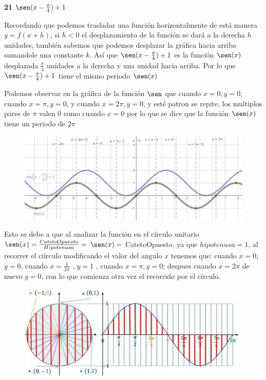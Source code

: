 \documentclass[12pt, letterpaper]{article}
\begin{document}
\newpage

\textbf{21} $\sen (x - \frac{\pi}{4}) + 1$

Recordando que podemos trasladar una función horizontalmente de está manera $y = f(x+h)$, si $h < 0$ el desplazamiento de la función se dará a la derecha $h$ unidades, también sabemos que podemos desplazar la gráfica hacia arriba sumandole una constante $k$. Así que $\sen (x - \frac{\pi}{4}) + 1$ es la función $\sen (x)$ desplazada $\frac{\pi}{4}$ unidades  a la derecha y una unidad hacia arriba. Por lo que $\sen (x - \frac{\pi}{4}) + 1$ tiene el mismo periodo $\sen (x)$

Podemos observar en la gráfica de la función $\sen$ que cuando $x = 0, y = 0$, cuando $x=\pi, y= 0$, y cuando $x = 2\pi, y= 0$, y esté patron se repite, los multiplos pares de $\pi$ valen 0 como cuando $x = 0$ por lo que se dice que la función $\sen (x)$ tiene un periodo de $2\pi$\\

\begin{figure}[ht]
\centering
\includegraphics[width=40em]{t7cuatro}
\end{figure}


Esto se debe a que al analizar la función en el círculo unitario $\sen (x) = \frac{CatetoOpuesto}{Hipotenusa} =$ $\sen(x) =$ CatetoOpuesto, ya que  $hipotenusa=1$,  al recorrer el ciírculo modificando el valor del angulo $x$ tenemos que: cuando $x = 0$, $y=0$,  cuando $x = \frac{1}{2 \pi}$ , $y = 1$ ,  cuando $x = \pi, y = 0$; despues cuando $x=2\pi$ de nuevo $y=0$, con lo que comienza otra vez el recorrido por el círculo.
\begin{figure}[ht]
\centering
\includegraphics[width=30em]{t7cinco}
\end{figure}
\end{document}
